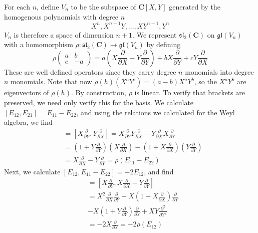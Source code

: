 For each $n$, define $V_n$ to be the subspace of $\mathbf{C}[X,Y]$ generated by the homogenous polynomials with degree $n$
%
\[ X^n, X^{n-1}Y, \dots, XY^{n-1}, Y^n \]
%
$V_n$ is therefore a space of dimension $n+1$. We represent $\mathfrak{sl}_2(\mathbf{C})$ on $\mathfrak{gl}(V_n)$ with a homomorphism $\rho: \mathfrak{sl}_2(\mathbf{C}) \to \mathfrak{gl}(V_n)$ by defining
%
\[ \rho \begin{pmatrix} a & b \\ c & -a \end{pmatrix} = a\left( X\frac{\partial}{\partial X} - Y \frac{\partial}{\partial Y} \right) + b X \frac{\partial}{\partial Y} + c Y \frac{\partial}{\partial X} \]
%
These are well defined operators since they carry degree $n$ monomials into degree $n$ monomials. Note that now $\rho(h)(X^aY^b) = (a - b) X^aY^b$, so the $X^aY^b$ are eigenvectors of $\rho(h)$. By construction, $\rho$ is linear. To verify that brackets are preserved, we need only verify this for the basis. We calculate $[E_{12}, E_{21}] = E_{11} - E_{22}$, and using the relations we calculated for the Weyl algebra, we find
%
\begin{align*}
    [\rho(E_{12}),\rho(E_{21})] &= \left[ X \frac{\partial}{\partial Y}, Y \frac{\partial}{\partial X} \right] = X \frac{\partial}{\partial Y} Y \frac{\partial}{\partial X} - Y \frac{\partial}{\partial X} X \frac{\partial}{\partial Y}\\
    &= \left(1 + Y \frac{\partial}{\partial Y} \right) \left( X \frac{\partial}{\partial X} \right) - \left( 1 + X \frac{\partial}{\partial X} \right) \left( Y \frac{\partial}{\partial Y} \right)\\
    &= X \frac{\partial}{\partial X} - Y \frac{\partial}{\partial Y} = \rho(E_{11} - E_{22})
\end{align*}
%
Next, we calculate $[E_{12}, E_{11} - E_{22}] = -2 E_{12}$, and find
%
\begin{align*}
    [\rho(E_{12}), \rho(E_{11} - E_{22})] &= \left[ X \frac{\partial}{\partial Y}, X \frac{\partial}{\partial X} - Y \frac{\partial}{\partial Y} \right]\\
    &= X^2 \frac{\partial}{\partial X} \frac{\partial}{\partial Y} - X \left(1 + X \frac{\partial}{\partial X} \right) \frac{\partial}{\partial Y}\\
    &- X \left( 1 + Y \frac{\partial}{\partial Y} \right) \frac{\partial}{\partial Y} + X Y \frac{\partial^2}{\partial Y^2}\\
    &= -2 X \frac{\partial}{\partial Y} = -2 \rho(E_{12})
\end{align*}
